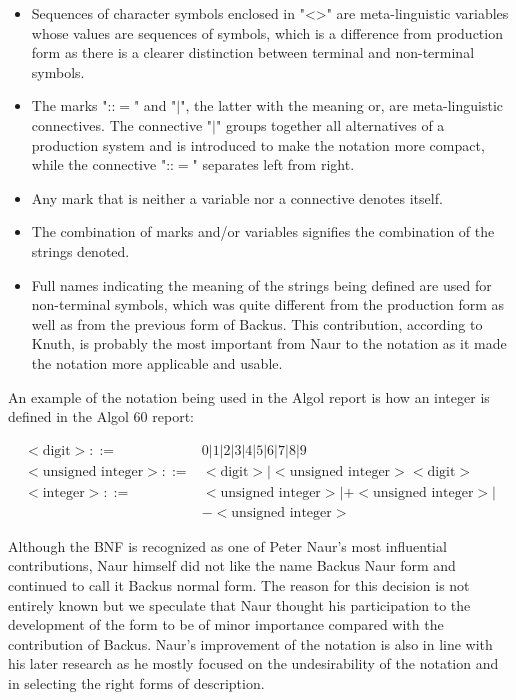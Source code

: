 \documentclass{article}
\begin{document}
\begin{itemize}
	\item Sequences of character symbols enclosed in "<>" are meta-linguistic variables whose values are sequences of symbols, which is a difference from production form as there is a clearer distinction between terminal and non-terminal symbols.
	\item The marks "::$=$" and "$|$", the latter with the meaning or, are meta-linguistic connectives. The connective "$|$" groups together all alternatives of a production system and is introduced to make the notation more compact, while the connective "::$=$" separates left from right.
	\item Any mark that is neither a variable nor a connective denotes itself.
	\item The combination of marks and/or variables signifies the combination of the strings denoted.
	\item Full names indicating the meaning of the strings being defined are used for non-terminal symbols, which was quite different from the production form as well as from the previous form of Backus. This contribution, according to Knuth, is probably the most important from Naur to the notation as it made the notation more applicable and usable.
\end{itemize}
\newpage
An example of the notation being used in the Algol report is how an integer is defined in the Algol 60 report:

\begin{equation} \label{eq3}
	\begin{split}
	<\text{digit}> ::=&0|1|2|3|4|5|6|7|8|9 \\
	<\text{unsigned integer}> ::=&<\text{digit}>|<\text{unsigned integer}><\text{digit}> \\
	<\text{integer}> ::=&<\text{unsigned integer}>|+<\text{unsigned integer}>|\\&-<\text{unsigned integer}>
	\end{split}
\end{equation}

Although the BNF is recognized as one of Peter Naur's most influential contributions, Naur himself did not like the name Backus Naur form and continued to call it Backus normal form. The reason for this decision is not entirely known but we speculate that Naur thought his participation to the development of the form to be of minor importance compared with the contribution of Backus. Naur's improvement of the notation is also in line with his later research as he mostly focused on the undesirability of the notation and in selecting the right forms of description. 
\end{document}
